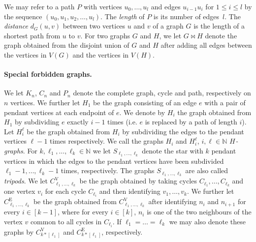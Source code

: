 \documentclass[runningheads,envcountsame]{llncs}
\newcommand{\sharedVertex}[1]{C^{\mathrm{V}}_{#1}}
\newcommand{\sharedEdge}[1]{C^{\mathrm{E}}_{#1}}
\newcommand{\Hgraph}[1]{H_{#1}}
\newcommand{\subdivStar}[1]{S_{#1}}
\newcommand{\join}{\bowtie}
\begin{document}
We may refer to a path $P$ with vertices $u_0,\ldots,u_l$ and edges $u_{i-1}u_i$ for $1\leq i\leq l$ by the
sequence $(u_0,u_1,u_2,\dots,u_l)$. The \emph{length} of $P$ is its number of edges~$l$.
The \emph{distance} $d_G(u,v)$ between two vertices $u$ and $v$ of a graph $G$ is the length of a
shortest path from $u$ to $v$.
For two graphs $G$ and $H$, we let $G\join H$ denote
the graph obtained from the disjoint union of $G$ and $H$ after adding
all edges between the vertices in $V(G)$ and the vertices in $V(H)$.

\paragraph{Special forbidden graphs.} We let $K_n$, $C_n$ and $P_n$ denote the complete graph, cycle and path, respectively on $n$ vertices. We further let $\Hgraph{1}$ be the graph consisting of an edge $e$ with a pair of pendant vertices at each endpoint of $e$. We denote by $\Hgraph{i}$ the graph obtained from $\Hgraph{1}$ by subdividing $e$ exactly $i-1$ times (i.e. $e$ is replaced by a path of length $i$). Let $\Hgraph{i}^{\ell}$ be the graph obtained from $\Hgraph{i}$ by subdividing the edges to the pendant vertices $\ell-1$ times respectively.
We call the graphs $\Hgraph{i}$ and $\Hgraph{i}^{\ell}$,
$i,\ell\in \mathbb{N}$  \emph{$\Hgraph{}$-graphs}. For
$k,\ell_1,\dots, \ell_k\in \mathbb{N}$ we let
$\subdivStar{\ell_1,\dots,\ell_k}$ denote the star with $k$ pendant
vertices in which the edges to the pendant vertices have been
subdivided $\ell_1-1,\dots, \ell_k-1$ times, respectively. The graphs
$\subdivStar{\ell_1,\dots,\ell_3}$ are also called \emph{tripods}.
We let
$\sharedVertex{\ell_1,\dots,\ell_k}$ be the graph obtained by taking
cycles $C_{\ell_1},\dots,C_{\ell_k}$ and one vertex $v_i$ for each
cycle $C_{\ell_i}$ and then identifying $v_1,\dots, v_k$.
We further let $\sharedEdge{\ell_1,\dots,\ell_k}$ be the graph
obtained from $\sharedVertex{\ell_1,\dots,\ell_k}$ after identifying
$n_i$ and $n_{i+1}$ for every $i \in [k-1]$, where for every $i \in [k]$, $n_i$ is one of the
two neighbours of the
vertex $v$ common to all cycles in $C_{\ell_i}$.
If $\ell_1 = \dots = \ell_k$ we may also denote these graphs by
$\sharedVertex{k * [\ell_1]}$ and $\sharedEdge{k * [\ell_1]}$, respectively.
\end{document}
